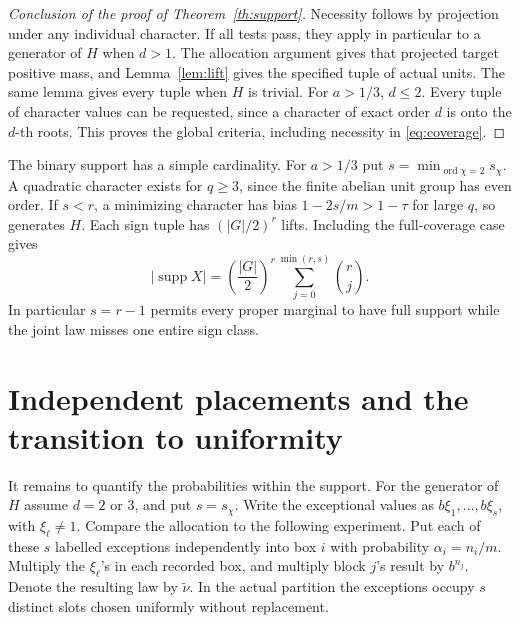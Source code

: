 \documentclass[11pt,letterpaper]{article}
\newcommand{\abs}[1]{\lvert#1\rvert}
\begin{document}
\begin{proof}[Conclusion of the proof of Theorem~\ref{th:support}]
Necessity follows by projection under any individual character. If all tests pass, they apply in particular to a generator of \(H\) when \(d>1\). The allocation argument gives that projected target positive mass, and Lemma~\ref{lem:lift} gives the specified tuple of actual units. The same lemma gives every tuple when \(H\) is trivial. For \(a>1/3\), \(d\le2\). Every tuple of character values can be requested, since a character of exact order \(d\) is onto the \(d\)-th roots. This proves the global criteria, including necessity in \eqref{eq:coverage}.
\end{proof}

The binary support has a simple cardinality. For \(a>1/3\) put \(s=\min_{\operatorname{ord}\chi=2}s_\chi\). A quadratic character exists for \(q\ge3\), since the finite abelian unit group has even order. If \(s<r\), a minimizing character has bias \(1-2s/m>1-\tau\) for large \(q\), so generates \(H\). Each sign tuple has \((\abs G/2)^r\) lifts. Including the full-coverage case gives
\begin{equation}\label{eq:hamming}
 \abs{\operatorname{supp}X}=
 \left(\frac{\abs G}{2}\right)^r
       \sum_{j=0}^{\min(r,s)}\binom rj .
\end{equation}
In particular \(s=r-1\) permits every proper marginal to have full support while the joint law misses one entire sign class.

\section{Independent placements and the transition to uniformity}
It remains to quantify the probabilities within the support. For the generator of \(H\) assume \(d=2\) or \(3\), and put \(s=s_\chi\). Write the exceptional values as \(b\xi_1,\ldots,b\xi_s\), with \(\xi_\ell\ne1\). Compare the allocation to the following experiment. Put each of these \(s\) labelled exceptions independently into box \(i\) with probability \(\alpha_i=n_i/m\). Multiply the \(\xi_\ell\)'s in each recorded box, and multiply block \(j\)'s result by \(b^{n_j}\). Denote the resulting law by \(\widetilde\nu\). In the actual partition the exceptions occupy \(s\) distinct slots chosen uniformly without replacement.
\end{document}
